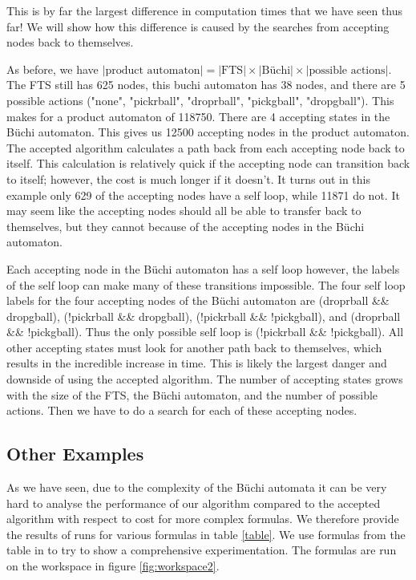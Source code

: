 This is by far the largest difference in computation times that we have seen thus far! We will show how this difference is caused by the searches from accepting nodes back to themselves.

As before, we have $|\text{product automaton}| =|\text{FTS}| \times |\text{B\"uchi}| \times |\text{possible actions}|$. The FTS still has 625 nodes, this buchi automaton has 38 nodes, and there are 5 possible actions ("none", "pickrball", "droprball", "pickgball", "dropgball"). This makes for a product automaton of 118750. There are 4 accepting states in the B\"uchi automaton. This gives us 12500 accepting nodes in the product automaton. The accepted algorithm calculates a path back from each accepting node back to itself. This calculation is relatively quick if the accepting node can transition back to itself; however, the cost is much longer if it doesn't. It turns out in this example only 629 of the accepting nodes have a self loop, while 11871 do not. It may seem like the accepting nodes should all be able to transfer back to themselves, but they cannot because of the accepting nodes in the B\"uchi automaton. 

Each accepting node in the B\"uchi automaton has a self loop however, the labels of the self loop can make many of these transitions impossible. The four self loop labels for the four accepting nodes of the B\"uchi automaton are (droprball \&\& dropgball), (!pickrball \&\& dropgball), (!pickrball \&\& !pickgball), and (droprball \&\& !pickgball). Thus the only possible self loop is (!pickrball \&\& !pickgball). All other accepting states must look for another path back to themselves, which results in the incredible increase in time. This is likely the largest danger and downside of using the accepted algorithm. The number of accepting states grows with the size of the FTS, the B\"uchi automaton, and the number of possible actions. Then we have to do a search for each of these accepting nodes.  



\subsection{Other Examples}
As we have seen, due to the complexity of the B\"uchi automata it can be very hard to analyse the performance of our algorithm compared to the accepted algorithm with respect to cost for more complex formulas. We therefore provide the results of runs for various formulas in table \ref{table}. We use formulas from the table in \cite{somenzi00} to try to show a comprehensive experimentation. The formulas are run on the workspace in figure \ref{fig:workspace2}. 

